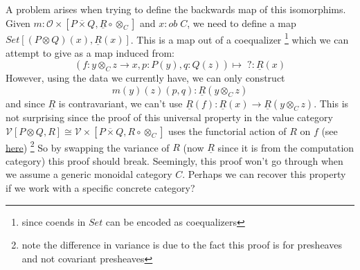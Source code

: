 \documentclass{article}
\begin{document}
A problem arises when trying to define the backwards map of this isomorphims. 
Given $m : \mathcal{O\times}[P \overline{\times} Q , \underline{R} \circ \otimes_C]$ and $x : ob \; C$, we need to define a map
$Set[(P \otimes Q)(x), \underline{R}(x)]$. This is a map out of a coequalizer 
\footnote{since coends in $Set$ can be encoded as coequalizers}
which we can attempt to give as a map induced from:
\[
    (f : y\otimes_C z \rightarrow x , p : P(y) , q : Q(z)) \mapsto \;? : \underline{R}(x)
\]
However, using the data we currently have, we can only construct
\[
    m(y)(z)(p,q) : \underline{R} (y \otimes_C z)    
\]
and since $\underline{R}$ is contravariant, we can't use $\underline{R}(f) : \underline{R}(x) \rightarrow \underline{R}(y \otimes_C z)$.
This is not surprising since the proof of this universal property in the value category 
$\mathcal{V}[P \otimes Q , R] \cong \mathcal{V\times}[P \overline{\times} Q , R \circ \otimes_C]$
uses the functorial action of $R$ on $f$ 
(see \href{https://github.com/bond15/Bunched-CBPV/blob/d4de5ebe3a2a42499b24c13a8d2da7f3a2cc1b36/src/Data/BiDCC.agda#L120}{here})
\footnote{note the difference in variance is due to the fact this proof is for presheaves and not covariant presheaves}
So by swapping the variance of $R$ (now $\underline{R}$ since it is from the computation category) this proof should break.
Seemingly, this proof won't go through when we assume a generic monoidal category $C$. Perhaps we can recover this property if 
we work with a specific concrete category?
\end{document}
